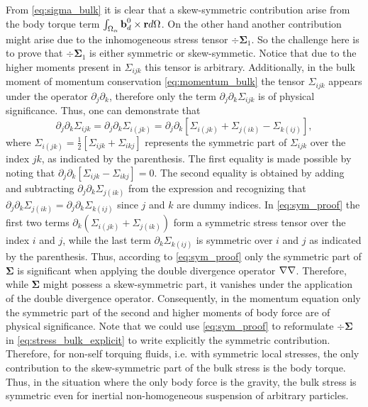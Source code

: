 From \ref{eq:sigma_bulk} it is clear that a skew-symmetric contribution arise from the body torque term $\int_{\Omega_{\alpha}} \textbf{b}_d^0 \times \textbf{r} d\Omega$. 
On the other hand another contribution might arise due to the inhomogeneous stress tensor $\div \bm\Sigma_1$. 
So the challenge here is to prove that  $\div \bm\Sigma_1$ is either symmetric or skew-symmetic. 
Notice that due to the higher moments present in $\Sigma_{ijk}$ this tensor is arbitrary. 
Additionally, in the bulk moment of momentum conservation \eqref{eq:momentum_bulk} the tensor $\Sigma_{ijk}$ appears under the operator $\partial_j \partial_k$, therefore only the term $\partial_j \partial_k \Sigma_{ijk}$ is of physical significance. 
Thus, one can demonstrate that \citep{lhuillier1996contribution}
\begin{equation}
    \partial_j \partial_k \Sigma_{ijk}
    = \partial_j \partial_k \Sigma_{i(jk)}
    =
    \partial_j \partial_k \left[
        \Sigma_{i(jk)}
        + \Sigma_{j(ik)}
        - \Sigma_{k(ij)}
    \right],
    \label{eq:sym_proof}
\end{equation}
where $\Sigma_{i(jk)} = \frac{1}{2}[\Sigma_{ijk} + \Sigma_{ikj}]$ represents the symmetric part of $\Sigma_{ijk}$ over the index $jk$, as indicated by the parenthesis. 
The first equality is made possible by noting that $\partial_j \partial_k [\Sigma_{ijk} - \Sigma_{ikj}] = 0$.
The second equality is obtained by adding and subtracting $\partial_j \partial_k \Sigma_{j(ik)}$ from the expression and recognizing that $\partial_j \partial_k \Sigma_{j(ik)} = \partial_j \partial_k \Sigma_{k(ij)}$ since $j$ and $k$ are dummy indices. 
In \ref{eq:sym_proof} the first two terms $\partial_k(\Sigma_{i(jk)} + \Sigma_{j(ik)})$ form a symmetric stress tensor over the index $i$ and $j$, while the last term $\partial_k\Sigma_{k(ij)}$ is symmetric over $i$ and $j$ as indicated by the parenthesis. 
Thus, according to \ref{eq:sym_proof} only the symmetric part of $\bm\Sigma$ is significant when applying the double divergence operator $\mathbf{\nabla}\mathbf{\nabla}$. 
Therefore, while $\bm\Sigma$ might possess a skew-symmetric part, it vanishes under the application of the double divergence operator. 
Consequently, in the momentum equation only the symmetric part of the second and higher moments of body force are of physical significance.
Note that we could use \ref{eq:sym_proof} to reformulate $\div\bm\Sigma$ in \ref{eq:stress_bulk_explicit} to write explicitly the symmetric contribution. 
Therefore, for non-self torquing fluids, i.e. with symmetric local stresses,  the only contribution to the skew-symmetric part of the bulk stress is the body torque.
Thus, in the situation where the only body force is the gravity, the bulk stress is symmetric even for inertial non-homogeneous suspension of arbitrary particles. 

